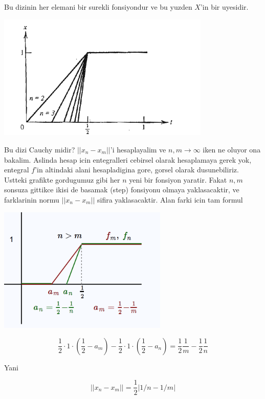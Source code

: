 \documentclass[12pt,fleqn]{article}\usepackage{../common}
\begin{document}
Bu dizinin her elemani bir surekli fonsiyondur ve bu yuzden $X$'in bir
uyesidir. 

\includegraphics[height=6cm]{5_1.png}

Bu dizi Cauchy midir? $||x_n - x_m||$'i hesaplayalim ve $n,m \to \infty$
iken ne oluyor ona bakalim. Aslinda hesap icin entegralleri cebirsel olarak
hesaplamaya gerek yok, entegral $f$'in altindaki alani hesapladigina gore,
gorsel olarak dusunebiliriz. Ustteki grafikte gordugumuz gibi her $n$ yeni
bir fonsiyon yaratir. Fakat $n,m$ sonsuza gittikce ikisi de basamak (step)
fonsiyonu olmaya yaklasacaktir, ve farklarinin normu $||x_n - x_m||$ sifira
yaklasacaktir. Alan farki icin tam formul

\includegraphics[height=6cm]{5_2.png}

\[ 
\frac{1}{2} \cdot 1 \cdot (\frac{ 1}{2}-a_m) - 
\frac{1}{2} \cdot 1 \cdot (\frac{ 1}{2}-a_n) =
\frac{ 1}{2}\frac{ 1}{m} - 
\frac{ 1}{2}\frac{ 1}{n} 
 \]

Yani

\[ ||x_n - x_m|| = \frac{ 1}{2}|1/n - 1/m| \]
\end{document}
